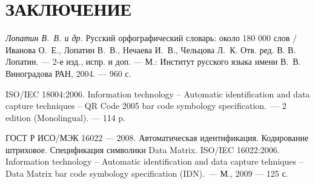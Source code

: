 \section*{ЗАКЛЮЧЕНИЕ}

\newpage

\renewcommand{\refname}{СПИСОК ИСПОЛЬЗОВАННЫХ ИСТОЧНИКОВ}

\begin{thebibliography}{99}
    \textit{Лопатин В.~В. и др.}  Русский орфографический словарь: 
    около 180 000 слов / Иванова О.~Е., Лопатин В.~В., Нечаева И.~В., 
    Чельцова Л.~К. Отв. ред. В. В. Лопатин. --- 2-е изд., испр. и доп. --- 
    М.: Институт русского языка имени В.~В. Виноградова РАН, 
    2004. --- 960 с.
    
    ISO/IEC 18004:2006. Information technology -- Automatic identification 
    and data capture techniques -- QR Code 2005 bar code symbology 
    specification.~--- 2 edition (Monolingual). --- 114 p. 
    
    ГОСТ Р ИСО/МЭК 16022 --- 2008. Автоматическая идентификация. Кодирование
    штриховое. Спецификация символики Data Matrix. ISO/IEC 16022:2006.
    Information technology -- Automatic identification and data capture
    tehniques -- Data Matrix bar code symbology specification (IDN).~--- 
    М., 2009 --- 125 с.
\end{thebibliography}
